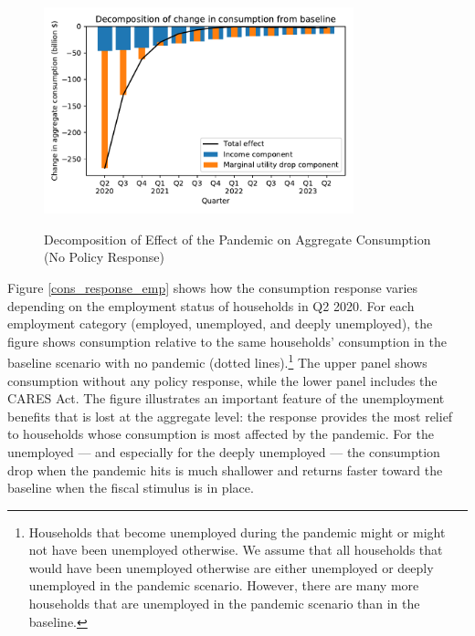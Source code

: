 \documentclass[titlepage,a4paper]{\econtex}
\begin{document}
\begin{figure}
  \centering
  \caption{Decomposition of Effect of the Pandemic on Aggregate Consumption (No Policy Response)}
  \label{cons_response2}
  { \includegraphics[width=0.8\textwidth]{./Figures/Decomposition}}
\end{figure}

Figure \ref{cons_response_emp} shows how the consumption response varies depending on the employment status of households in Q2 2020.
For each employment category (employed, unemployed, and deeply unemployed), the figure shows consumption relative to the same households' consumption in the baseline scenario with no pandemic (dotted lines).\footnote{Households that become unemployed during the pandemic might or might not have been unemployed otherwise. We assume that all households that would have been unemployed otherwise are either unemployed or deeply unemployed in the pandemic scenario. However, there are many more households that are unemployed in the pandemic scenario than in the baseline.}
The upper panel shows consumption without any policy response, while the lower panel includes the CARES Act.
The figure illustrates an important feature of the unemployment benefits that is lost at the aggregate level: the response provides the most relief to households whose consumption is most affected by the pandemic.
For the unemployed --- and especially for the deeply unemployed --- the consumption drop when the pandemic hits is much shallower and returns faster toward the baseline when the fiscal stimulus is in place.
\end{document}
